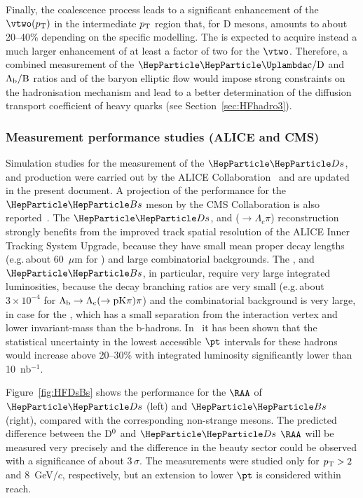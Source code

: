 Finally, the coalescence process leads to a significant enhancement of the $\vtwo(\pT)$ in the
intermediate $p\sb{\scriptstyle\mathrm{T}}$ region that, for D mesons, amounts to about 20--40\% depending on the
specific modelling. The \PGLc is expected to acquire instead a much 
larger enhancement of at least a factor of two for the $\vtwo$. Therefore, a combined measurement of the
$\rm \PGLc/D$ and $\rm \Lambda_b/B$ ratios and of the baryon elliptic flow would impose strong constraints
on the hadronisation mechanism and lead to a better determination of the diffusion transport coefficient of heavy quarks (see Section~\ref{sec:HFhadro3}).

\subsubsection{Measurement performance studies (ALICE and CMS)}
\label{sec:HFhadro2}


Simulation studies for the measurement of the $\PDs$, \PGLc and \PGLb
production were carried out by the ALICE Collaboration~\cite{Abelev:1625842} and are updated in the present document. A projection of the performance for the $\PBs$ meson by the CMS Collaboration is also reported~\cite{CMS-PAS-FTR-17-002}. The $\PDs$, \PGLc and \PGLb ($\to\Lambda_c\pi$) reconstruction strongly benefits from the improved track spatial resolution of the ALICE Inner Tracking System Upgrade, because they have small mean proper decay lengths (e.g.\,about 60~$\mu$m for \PGLc)
and large combinatorial backgrounds. The \PGLc, \PGLb and $\PBs$, in particular, require very large integrated luminosities, because the decay branching ratios are very small (e.g.\,about $3\times 10^{-4}$ for $\rm \Lambda_b\to\Lambda_c(\to pK\pi)\pi$) and the combinatorial background is very large, in case for the \PGLc, which has a small separation from the interaction vertex and lower invariant-mass than the b-hadrons. In~\cite{CMS-PAS-FTR-17-002} it has been shown that the statistical uncertainty in the lowest accessible $\pt$ intervals for these hadrons would increase above 20--30\% with integrated luminosity significantly lower than 10~nb$^{-1}$.

Figure~\ref{fig:HFDsBs} shows the performance for the $\RAA$ of $\PDs$ (left) and $\PBs$ (right), compared with the corresponding non-strange mesons. The predicted difference between the $\rm D^0$ and $\PDs$ $\RAA$ will be measured very precisely and the difference in the beauty sector could be observed with a significance of about 3\,$\sigma$.
The measurements were studied only for $p_{\rm T}>2$ and 8~GeV$/c$, respectively, but an extension to lower $\pt$ is considered within reach.

